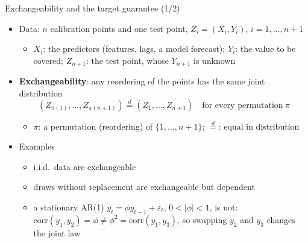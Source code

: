\begin{frame}{Exchangeability and the target guarantee (1/2)}
\itemsize{\small}
\begin{itemize}
    \item Data: $n$ calibration points and one test point, $Z_i = (X_i, Y_i)$, $i = 1, \dots, n + 1$
    \begin{itemize}
        \item $X_i$: the predictors (features, lags, a model forecast); $Y_i$: the value to be covered; $Z_{n+1}$: the test point, whose $Y_{n+1}$ is unknown
    \end{itemize}
    \item \textbf{Exchangeability}: any reordering of the points has the same joint distribution \[ (Z_{\pi(1)}, \dots, Z_{\pi(n+1)}) \overset{d}{=} (Z_1, \dots, Z_{n+1}) \quad \text{for every permutation} \ \pi \]
    \begin{itemize}
        \item $\pi$: a permutation (reordering) of $\{1, \dots, n + 1\}$; $\overset{d}{=}$: equal in distribution
    \end{itemize}
    \item Examples
    \begin{itemize}
        \item i.i.d.\ data are exchangeable
        \item draws without replacement are exchangeable but dependent
        \item a stationary AR(1) $y_t = \phi y_{t-1} + \varepsilon_t$, $0 < |\phi| < 1$, is not: $\mathrm{corr}(y_1, y_2) = \phi \ne \phi^2 = \mathrm{corr}(y_1, y_3)$, so swapping $y_2$ and $y_3$ changes the joint law
    \end{itemize}
\end{itemize}
\end{frame}

